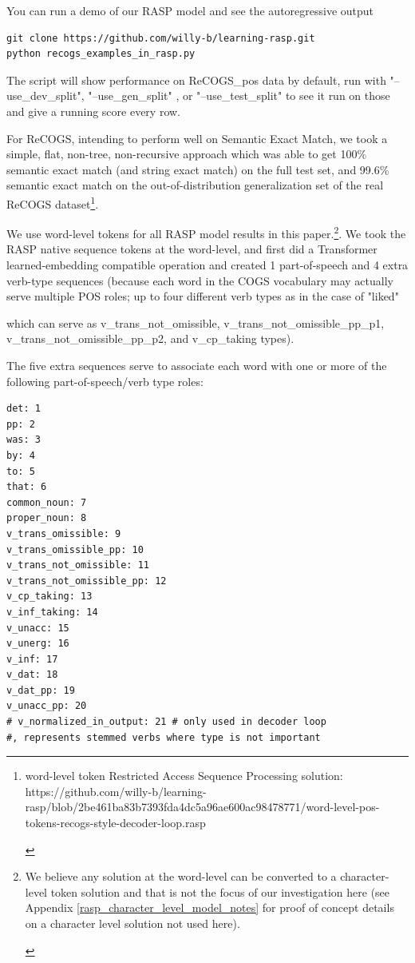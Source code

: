 \documentclass[11pt]{article}
\begin{document}
You can run a demo of our RASP model and see the autoregressive output 

\begin{tiny}
\begin{verbatim}
git clone https://github.com/willy-b/learning-rasp.git
python recogs_examples_in_rasp.py 
\end{verbatim}
\end{tiny}

The script will show performance on \cite{Wu2023} ReCOGS\_pos data by default, run with "--use\_dev\_split", "--use\_gen\_split" , or "--use\_test\_split" to see it run on those and give a running score every row.

For ReCOGS, intending to perform well on Semantic Exact Match, we took a simple, flat, non-tree, non-recursive approach which was able to get 100\% semantic exact match (and string exact match) on the full test set, and 99.6\% semantic exact match on the out-of-distribution generalization set of the real ReCOGS dataset\footnote{\begin{footnotesize} word-level token Restricted Access Sequence Processing solution: https://github.com/willy-b/learning-rasp/blob/2be461ba83b7393fda4dc5a96ae600ac98478771/word-level-pos-tokens-recogs-style-decoder-loop.rasp \end{footnotesize}}.

We use word-level tokens for all RASP model results in this paper.\footnote{\begin{footnotesize}We believe any solution at the word-level can be converted to a character-level token solution and that is not the focus of our investigation here (see Appendix \ref{rasp_character_level_model_notes} for proof of concept details on a character level solution not used here).\end{footnotesize}}. We took the RASP native sequence tokens at the word-level, and first did a Transformer learned-embedding compatible operation and created 1 part-of-speech and 4 extra verb-type sequences (because each word in the COGS vocabulary may actually serve multiple POS roles; up to four different verb types as in the case of "liked" 

which can serve as v\_trans\_not\_omissible, v\_trans\_not\_omissible\_pp\_p1, v\_trans\_not\_omissible\_pp\_p2, and v\_cp\_taking types). 

The five extra sequences serve to associate each word with one or more of the following part-of-speech/verb type roles:
\begin{tiny}
\begin{verbatim}
det: 1
pp: 2
was: 3
by: 4
to: 5
that: 6
common_noun: 7
proper_noun: 8
v_trans_omissible: 9
v_trans_omissible_pp: 10
v_trans_not_omissible: 11
v_trans_not_omissible_pp: 12
v_cp_taking: 13
v_inf_taking: 14
v_unacc: 15
v_unerg: 16
v_inf: 17
v_dat: 18
v_dat_pp: 19
v_unacc_pp: 20
# v_normalized_in_output: 21 # only used in decoder loop 
#, represents stemmed verbs where type is not important
\end{verbatim}
\end{tiny}
\end{document}
